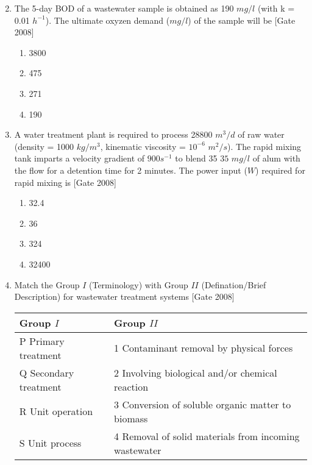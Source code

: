 \documentclass[journal]{IEEEtran}
\begin{document}
\begin{enumerate}
\begin{multicols}{2}
\begin{enumerate}
	\end{enumerate}
\end{multicols}
	\item The 5-day BOD of a wastewater sample is obtained as 190 $mg/l$ (with k = 0.01 $h^{-1}$). The ultimate oxyzen demand ($mg/l$) of the sample will be \hfill [Gate 2008]
	\begin{multicols}{4}
	\begin{enumerate}
		\item 3800
		\item 475
		\item 271
		\item 190
	\end{enumerate}
\end{multicols}
\item A water treatment plant is required to process 28800 $m^3/d$ of raw water (density = 1000 $kg/m^3$, kinematic viscosity = $10^{-6}$ $m^2/s$). The rapid mixing tank imparts a velocity gradient of $900 s^{-1}$ to blend 35 $35$ $mg/l$ of alum with the flow for a detention time for 2 minutes. The power input ($W$) required for rapid mixing is \hfill [Gate 2008]
\begin{multicols}{4}
	\begin{enumerate}
		\item 32.4
		\item 36
		\item 324
		\item 32400
	\end{enumerate}
\end{multicols}
	\item Match the Group $I$ (Terminology) with Group $II$ (Defination/Brief Description) for wastewater treatment systems \hfill [Gate 2008] \\
\begin{center}

\begin{tabular}{|l|l|}
	\hline 
	Group $I$ & Group $II$\\
	\hline
	P Primary treatment   & 1 Contaminant removal by physical forces \\
	\hline
	Q Secondary treatment & 2 Involving biological and/or chemical reaction\\
	\hline
	R Unit operation & 3 Conversion of soluble organic matter to biomass \\
	\hline
	S Unit process & 4 Removal of solid materials from incoming wastewater\\
	\hline


\end{tabular}
\end{center}
\end{enumerate}
\end{document}
